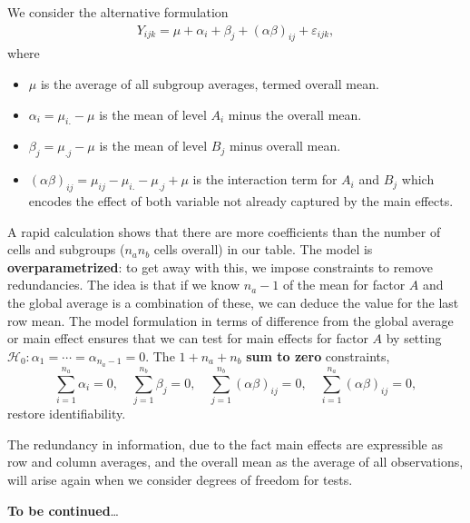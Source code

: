 \documentclass[
  11pt,
  letterpaper,
]{scrbook}
\providecommand{\tightlist}{%
  \setlength{\itemsep}{0pt}\setlength{\parskip}{0pt}}\usepackage{longtable,booktabs,array}
\theoremstyle{definition}
\theoremstyle{definition}
\theoremstyle{remark}
\begin{document}
We consider the alternative formulation \begin{align*}
Y_{ijk} = \mu + \alpha_i + \beta_j + (\alpha\beta)_{ij} + \varepsilon_{ijk},
\end{align*} where

\begin{itemize}
\tightlist
\item
  \(\mu\) is the average of all subgroup averages, termed overall mean.
\item
  \(\alpha_i = \mu_{i.} - \mu\) is the mean of level \(A_i\) minus the
  overall mean.
\item
  \(\beta_j  = \mu_{.j} - \mu\) is the mean of level \(B_j\) minus
  overall mean.
\item
  \((\alpha\beta)_{ij} = \mu_{ij} - \mu_{i.} - \mu_{.j} + \mu\) is the
  interaction term for \(A_i\) and \(B_j\) which encodes the effect of
  both variable not already captured by the main effects.
\end{itemize}

A rapid calculation shows that there are more coefficients than the
number of cells and subgroups (\(n_an_b\) cells overall) in our table.
The model is \textbf{overparametrized}: to get away with this, we impose
constraints to remove redundancies. The idea is that if we know
\(n_a-1\) of the mean for factor \(A\) and the global average is a
combination of these, we can deduce the value for the last row mean. The
model formulation in terms of difference from the global average or main
effect ensures that we can test for main effects for factor \(A\) by
setting \(\mathscr{H}_0: \alpha_1 = \cdots = \alpha_{n_a-1}=0\). The
\(1 +  n_a + n_b\) \textbf{sum to zero} constraints,
\[\sum_{i=1}^{n_a} \alpha_i=0, \quad \sum_{j=1}^{n_b} \beta_j=0, \quad  \sum_{j=1}^{n_b} (\alpha\beta)_{ij}=0, \quad \sum_{i=1}^{n_a} (\alpha\beta)_{ij}=0,\]
restore identifiability.

The redundancy in information, due to the fact main effects are
expressible as row and column averages, and the overall mean as the
average of all observations, will arise again when we consider degrees
of freedom for tests.

\textbf{To be continued}\ldots{}
\end{document}
